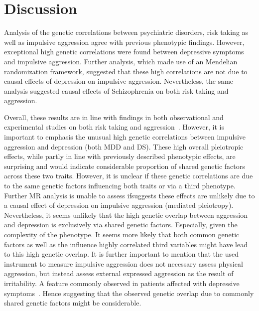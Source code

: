\section{Discussion}
\label{sec:discussion}

Analysis of the genetic correlations between psychiatric disorders, risk taking as well as impulsive aggression agree with previous phenotypic findings.
However, exceptional high genetic correlations were found between depressive symptoms and impulsive aggression.
Further analysis, which made use of an Mendelian randomization framework, suggested that these high correlations are not due to causal effects of depression on impulsive aggression.
Nevertheless, the same analysis suggested causal effects of Schizophrenia on both risk taking and aggression. 

Overall, these results are in line with findings in both observational and experimental studies on both risk taking and aggression~\cite{Ballester2012,Ouzir2013,Hoptman2015,Sher2005,Roland2002,Taft2009, Dutton2013}.
However, it is important to emphasis the unusual high genetic correlations between impulsive aggression and depression (both MDD and DS).  
These high overall pleiotropic effects, while partly in line with previously described phenotypic effects, are surprising and would indicate considerable proportion of shared genetic factors across these two traits.
However, it is unclear if these genetic correlations are due to the same genetic factors influencing both traits or via a third phenotype.
Further MR analysis is unable to assess ifsuggests  these effects are unlikely due to a causal effect of depression on impulsive aggression (mediated pleiotropy).
Nevertheless, it seems unlikely that the high genetic overlap between aggression and depression is exclusively via shared genetic factors.
Especially, given the complexity of the phenotype.
It seems more likely that both common genetic factors as well as the influence highly correlated third variables might have lead to this high genetic overlap.
It is further important to mention that the used instrument to measure impulsive aggression does not necessary assess physical aggression, but instead assess external expressed aggression as the result of irritability. 
A feature commonly observed in patients affected with depressive symptoms~\cite{Dutton2013,Clark1994}.
Hence suggesting that the observed genetic overlap due to commonly shared genetic factors might be considerable.

